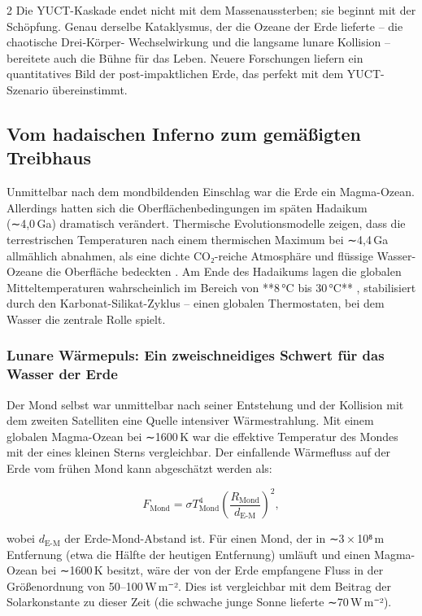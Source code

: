 \documentclass[11pt,a4paper]{article}
\begin{document}
\begin{multicols}{2}
		Die YUCT-Kaskade endet nicht mit dem Massenaussterben; sie beginnt mit der Schöpfung.
		Genau derselbe Kataklysmus, der die Ozeane der Erde lieferte – die chaotische Drei‑Körper-
		Wechselwirkung und die langsame lunare Kollision – bereitete auch die Bühne für das Leben.
		Neuere Forschungen liefern ein quantitatives Bild der post-impaktlichen Erde, das perfekt mit dem YUCT-Szenario übereinstimmt.
		
		\subsection{Vom hadaischen Inferno zum gemäßigten Treibhaus}
		
		Unmittelbar nach dem mondbildenden Einschlag war die Erde ein Magma-Ozean. Allerdings
		hatten sich die Oberflächenbedingungen im späten Hadaikum (∼4,0 Ga) dramatisch verändert.
		Thermische Evolutionsmodelle zeigen, dass die terrestrischen Temperaturen nach einem thermischen Maximum bei ∼4,4 Ga allmählich abnahmen, als eine dichte CO₂-reiche Atmosphäre und flüssige Wasser-Ozeane die Oberfläche bedeckten \cite{Korenaga2017}. Am Ende des Hadaikums lagen die globalen Mitteltemperaturen wahrscheinlich im Bereich von **8 °C bis 30 °C** \cite{Charnay2017}, stabilisiert durch den Karbonat-Silikat-Zyklus – einen globalen Thermostaten, bei dem Wasser die zentrale Rolle spielt.
		
		\subsubsection{Lunare Wärmepuls: Ein zweischneidiges Schwert für das Wasser der Erde}
		
		Der Mond selbst war unmittelbar nach seiner Entstehung und der Kollision mit dem zweiten Satelliten eine Quelle intensiver Wärmestrahlung. Mit einem globalen Magma-Ozean bei ∼1600 K war die effektive Temperatur des Mondes mit der eines kleinen Sterns vergleichbar. Der einfallende Wärmefluss auf der Erde vom frühen Mond kann abgeschätzt werden als:
		
		\[
		F_{\text{Mond}} = \sigma T_{\text{Mond}}^{4} \left( \frac{R_{\text{Mond}}}{d_{\text{E-M}}} \right)^{2},
		\]
		
		wobei \(d_{\text{E-M}}\) der Erde-Mond-Abstand ist. Für einen Mond, der in ∼3 × 10⁸ m Entfernung (etwa die Hälfte der heutigen Entfernung) umläuft und einen Magma-Ozean bei ∼1600 K besitzt, wäre der von der Erde empfangene Fluss in der Größenordnung von 50–100 W m⁻². Dies ist vergleichbar mit dem Beitrag der Solarkonstante zu dieser Zeit (die schwache junge Sonne lieferte ∼70 W m⁻²).
		

\end{multicols}
\end{document}
